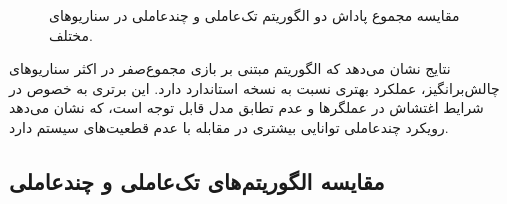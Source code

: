 \begin{figure}[H]
	\caption{مقایسه مجموع پاداش دو الگوریتم تک‌عاملی و چندعاملی  در سناریوهای مختلف. 
		}
	\label{fig:ddpg_robustness_violin}
\end{figure}

نتایج نشان می‌دهد که الگوریتم  مبتنی بر بازی مجموع‌صفر در اکثر سناریوهای چالش‌برانگیز، عملکرد بهتری نسبت به نسخه استاندارد دارد. این برتری به خصوص در شرایط اغتشاش در عملگرها و عدم تطابق مدل قابل توجه است، که نشان می‌دهد رویکرد چندعاملی توانایی بیشتری در مقابله با عدم قطعیت‌های سیستم دارد.

\subsection{مقایسه الگوریتم‌های تک‌عاملی و چندعاملی }

